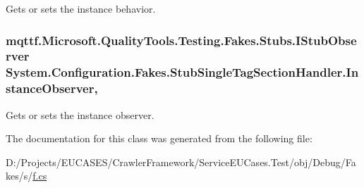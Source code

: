 Gets or sets the instance behavior.

\hypertarget{class_system_1_1_configuration_1_1_fakes_1_1_stub_single_tag_section_handler_ab9f29d5d56e030489457f9547f30e1a1}{
\subsubsection[{Instance\-Observer}]{\setlength{\rightskip}{0pt plus 5cm}mqttf.\-Microsoft.\-Quality\-Tools.\-Testing.\-Fakes.\-Stubs.\-I\-Stub\-Observer System.\-Configuration.\-Fakes.\-Stub\-Single\-Tag\-Section\-Handler.\-Instance\-Observer\hspace{0.3cm}{\ttfamily [get]}, {\ttfamily [set]}}}\label{class_system_1_1_configuration_1_1_fakes_1_1_stub_single_tag_section_handler_ab9f29d5d56e030489457f9547f30e1a1}


Gets or sets the instance observer.



The documentation for this class was generated from the following file\-:\begin{DoxyCompactItemize}
\item 
D\-:/\-Projects/\-E\-U\-C\-A\-S\-E\-S/\-Crawler\-Framework/\-Service\-E\-U\-Cases.\-Test/obj/\-Debug/\-Fakes/s/\hyperlink{s_2f_8cs}{f.\-cs}\end{DoxyCompactItemize}

